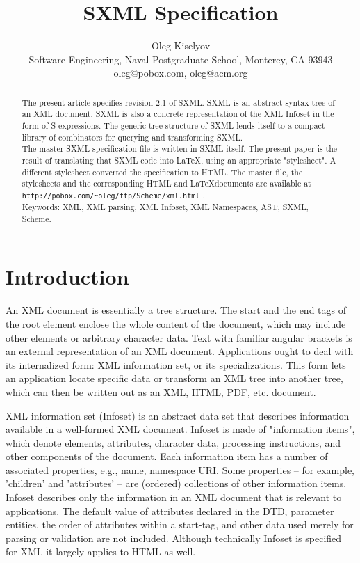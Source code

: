 \documentclass[10pt]{article}
\begin{document}
\title{SXML Specification}
\author{Oleg Kiselyov\\Software Engineering, Naval Postgraduate School, Monterey, CA 93943\\oleg@pobox.com, oleg@acm.org}
\maketitle
\begin{abstract}
The present article specifies revision 2.1 of SXML. SXML is an abstract syntax tree of an XML document. SXML is also
a concrete representation of the XML Infoset in the form of
S-expressions. The generic tree structure of SXML lends itself to a
compact library of combinators for querying and transforming SXML.\\The master SXML specification file is written in SXML itself. The present paper is the result of translating that SXML code into \LaTeX, using an appropriate "stylesheet". A different stylesheet converted the specification to HTML. The master file, the stylesheets and the corresponding HTML and \LaTeX documents are available at  \texttt{http://pobox.com/\textasciitilde{}oleg/ftp/Scheme/xml.html} .\\Keywords: XML, XML parsing, XML Infoset, XML Namespaces, AST, SXML, Scheme.\end{abstract}
\section{Introduction}
An XML document is essentially a tree structure. The start and the end
tags of the root element enclose the whole content of the document,
which may include other elements or arbitrary character data.  Text
with familiar angular brackets is an external representation of an XML
document. Applications ought to deal with its internalized form:
XML information set, or its specializations.  This form lets an
application locate specific data or transform an XML tree into another
tree, which can then be written out as an XML, HTML, PDF, etc.
document.

XML information set (Infoset) \cite{XML Infoset} is an
abstract data set that describes information available in a
well-formed XML document.  Infoset is made of "information items",
which denote elements, attributes, character data, processing
instructions, and other components of the document. Each information
item has a number of associated properties, e.g., name, namespace
URI. Some properties -- for example, 'children' and 'attributes' --
are (ordered) collections of other information items. Infoset describes
only the information in an XML document that is relevant to
applications. The default value of attributes declared in the DTD, parameter
entities, the order of attributes within a start-tag, and other data used merely for parsing or validation are not included. Although technically 
Infoset is specified for XML it largely applies to HTML as well.
\end{document}
